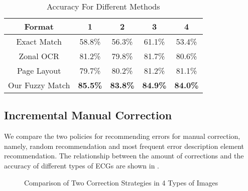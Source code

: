 \begin{table}[th]
\centering
\caption{Accuracy For Different Methods}
\label{tab:compare}
\begin{tabular}{|c|c|c|c|c|}
\hline
Format & 1 & 2 & 3 & 4\\
\hline \hline
Exact Match & 58.8\% & 56.3\% & 61.1\% & 53.4\% \\
\hline
Zonal OCR & 81.2\% & 79.8\% & 81.7\% & 80.6\% \\
\hline
Page Layout & 79.7\% & 80.2\% & 81.2\% & 81.1\% \\
\hline
Our Fuzzy Match & {\bf 85.5\%} & {\bf 83.8\%} & {\bf 84.9\%} & {\bf 84.0\%}\\ 
\hline
\end{tabular}
\end{table}

\subsection{Incremental Manual Correction}
We compare the two policies for recommending errors for manual correction, 
namely, random recommendation and most frequent error 
description element recommendation. The relationship between the 
amount of corrections and the accuracy of different types of 
ECGs are shown in . 


\begin{figure}[!ht]
\centering
{}
{}
\hfill
{}
{}
\caption{Comparison of Two Correction Strategies in 4 Types of Images}
\label{fig:humancorr}
\end{figure}

